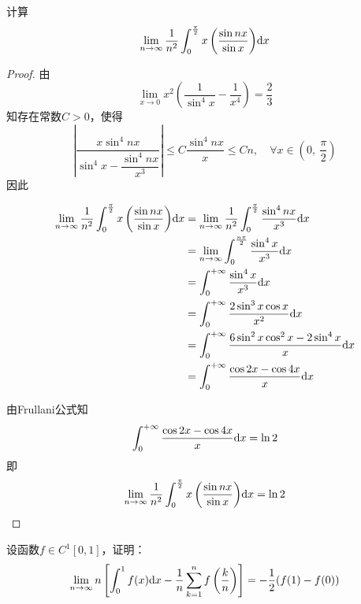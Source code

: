 \begin{proposition}

    计算
    $$\lim\limits_{n\to\infty}{\dfrac{1}{n^2}\int_{0}^{\frac{\pi}{2}}{x\left(\dfrac{\sin{nx}}{\sin{x}}\right)}}\mathrm{d} x$$

\end{proposition}

\begin{proof}

    由
    $$\lim\limits_{x \to 0}{x^2\left(\dfrac{1}{\sin^4{x}} - \dfrac{1}{x^4}\right)} = \dfrac{2}{3}$$
    知存在常数$C > 0$，使得
    $$\left| \dfrac{x\sin^4{nx}}{\sin^4{x} - \dfrac{\sin^4{nx}}{x^3}}\right| \leq C\dfrac{\sin^4{nx}}{x} \leq Cn, \quad \forall x \in \left(0,\ \dfrac{\pi}{2}\right)$$
    因此

    \begin{align*}
        \lim\limits_{n\to\infty}{\dfrac{1}{n^2}\int_{0}^{\frac{\pi}{2}}{x\left(\dfrac{\sin{nx}}{\sin{x}}\right)}}\mathrm{d} x & = \lim\limits_{n\to\infty}{\dfrac{1}{n^2}\int_{0}^{\frac{\pi}{2}}{\dfrac{\sin^4{nx}}{x^3}\mathrm{d} x}} \\
        & = \lim\limits_{n\to\infty}{\int_{0}^{\frac{n\pi}{2}}{\dfrac{\sin^4{x}}{x^3}}\mathrm{d} x} \\
        & = \int_{0}^{+\infty}{\dfrac{\sin^4{x}}{x^3}}\mathrm{d} x \\
        & = \int_{0}^{+\infty}{\dfrac{2\sin^3{x}\cos{x}}{x^2}}\mathrm{d} x \\
        & = \int_{0}^{+\infty}{\dfrac{6\sin^2{x}\cos^2{x} - 2\sin^4{x}}{x}}\mathrm{d} x \\
        & = \int_{0}^{+\infty}{\dfrac{\cos{2x} - \cos{4x}}{x}}\mathrm{d} x
    \end{align*}

    由\textup{Frullani}公式知
    $$\int_{0}^{+\infty}{\dfrac{\cos{2x} - \cos{4x}}{x}}\mathrm{d} x = \ln{2}$$
    即
    $$\lim\limits_{n\to\infty}{\dfrac{1}{n^2}\int_{0}^{\frac{\pi}{2}}{x\left(\dfrac{\sin{nx}}{\sin{x}}\right)}}\mathrm{d} x = \ln{2}$$

\end{proof}


\begin{proposition}

    设函数$f \in C^{1}[0,1]$，证明：
    $$\lim\limits_{n\to\infty}{n \left[\int_{0}^{1}{f(x)}\mathrm{d} x - \dfrac{1}{n}\sum\limits_{k = 1}^{n}{f\left(\dfrac{k}{n}\right)}\right]} = -\dfrac{1}{2}(f(1) - f(0))$$

\end{proposition}

